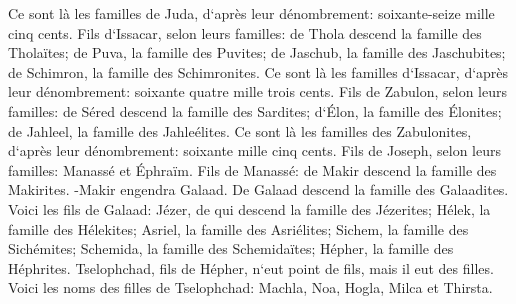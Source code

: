 \verse Ce sont là les familles de Juda, d`après leur dénombrement: soixante-seize mille cinq cents. 
\verse Fils d`Issacar, selon leurs familles: de Thola descend la famille des Tholaïtes; de Puva, la famille des Puvites; 
\verse de Jaschub, la famille des Jaschubites; de Schimron, la famille des Schimronites. 
\verse Ce sont là les familles d`Issacar, d`après leur dénombrement: soixante quatre mille trois cents. 
\verse Fils de Zabulon, selon leurs familles: de Séred descend la famille des Sardites; d`Élon, la famille des Élonites; de Jahleel, la famille des Jahleélites. 
\verse Ce sont là les familles des Zabulonites, d`après leur dénombrement: soixante mille cinq cents. 
\verse Fils de Joseph, selon leurs familles: Manassé et Éphraïm. 
\verse Fils de Manassé: de Makir descend la famille des Makirites. -Makir engendra Galaad. De Galaad descend la famille des Galaadites. 
\verse Voici les fils de Galaad: Jézer, de qui descend la famille des Jézerites; Hélek, la famille des Hélekites; 
\verse Asriel, la famille des Asriélites; Sichem, la famille des Sichémites; 
\verse Schemida, la famille des Schemidaïtes; Hépher, la famille des Héphrites. 
\verse Tselophchad, fils de Hépher, n`eut point de fils, mais il eut des filles. Voici les noms des filles de Tselophchad: Machla, Noa, Hogla, Milca et Thirsta. 
